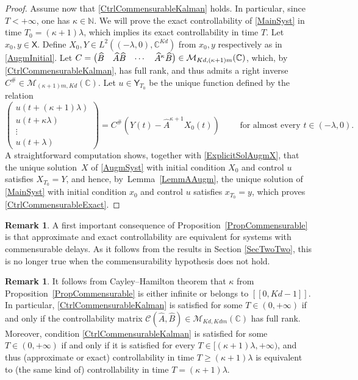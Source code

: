 \documentclass[10pt]{amsart}
\renewenvironment{bmatrix}{\bigl(\begin{matrix}}{\end{matrix}\bigr)}
\newcommand{\llbracket}{[\![}
\newcommand{\rrbracket}{]\!]}
\theoremstyle{plain}
\theoremstyle{definition}
\newtheorem{remk}[theo]{Remark}
\begin{document}
\begin{proof}
Assume now that \eqref{CtrlCommensurableKalman} holds. In particular, since $T < +\infty$, one has $\kappa \in \mathbb N$. We will prove the exact controllability of \eqref{MainSyst} in time $T_0 = (\kappa + 1)\lambda$, which implies its exact controllability in time $T$. Let $x_0, y \in \mathsf X$. Define $X_0, Y \in L^2((-\lambda, 0), \mathbb C^{Kd})$ from $x_0, y$ respectively as in \eqref{AugmInitial}. Let $C = \begin{bmatrix}\widehat B & \widehat A \widehat B & \cdots & \widehat A^\kappa \widehat B\end{bmatrix} \in \mathcal M_{Kd, (\kappa + 1) m}(\mathbb C)$, which, by \eqref{CtrlCommensurableKalman}, has full rank, and thus admits a right inverse $C^\# \in \mathcal M_{(\kappa + 1) m, Kd}(\mathbb C)$. Let $u \in \mathsf Y_{T_0}$ be the unique function defined by the relation
\[
\begin{pmatrix}
u(t + (\kappa + 1)\lambda) \\
u(t + \kappa \lambda) \\
\vdots \\
u(t + \lambda)
\end{pmatrix} = C^\# \left(Y(t) - \widehat A^{\kappa + 1} X_0(t)\right) \qquad \text{ for almost every } t \in (-\lambda, 0).
\]
A straightforward computation shows, together with \eqref{ExplicitSolAugmX}, that the unique solution~$X$ of \eqref{AugmSyst} with initial condition $X_0$ and control $u$ satisfies $X_{T_0} = Y$, and hence, by~Lemma~\ref{LemmAAugm}, the unique solution of \eqref{MainSyst} with initial condition $x_0$ and control $u$ satisfies $x_{T_0} = y$, which proves \eqref{CtrlCommensurableExact}.
\end{proof}

\begin{remk}
A first important consequence of Proposition~\ref{PropCommensurable} is that approximate and exact controllability are equivalent for systems with commensurable delays. As it follows from the results in Section \ref{SecTwoTwo}, this is no longer true when the commensurability hypothesis does not hold.
\end{remk}

\begin{remk}
\label{RemkCayleyHamilton}
It follows from Cayley--Hamilton theorem that $\kappa$ from Proposition~\ref{PropCommensurable} is either infinite or belongs to $\llbracket 0, Kd - 1\rrbracket$. In particular, \eqref{CtrlCommensurableKalman} is satisfied for some $T \in (0, +\infty)$ if and only if the controllability matrix $\mathcal C(\widehat A, \widehat B) \in \mathcal M_{Kd, Kdm}(\mathbb C)$ has full rank. Moreover, condition \eqref{CtrlCommensurableKalman} is satisfied for some $T \in (0, +\infty)$ if and only if it is satisfied for every $T \in [(\kappa + 1) \lambda, +\infty)$, and thus (approximate or exact) controllability in time $T \geq (\kappa + 1) \lambda$ is equivalent to (the same kind of) controllability in time $T = (\kappa + 1)\lambda$.
\end{remk}
\end{document}
